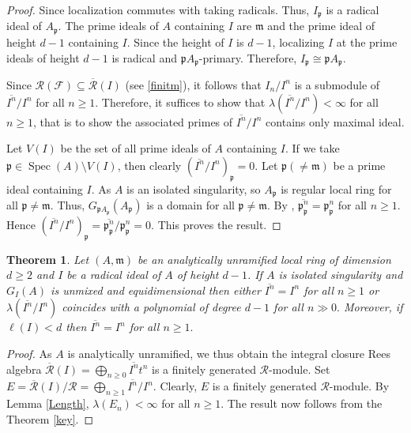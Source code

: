 \documentclass[11pt]{amsart}
\theoremstyle{plain}
\newtheorem{theorem}{Theorem}[section]
\newcommand{\p}{\mathfrak{p}}
\newcommand{\m}{\mathfrak{m}}
\newcommand{\R}{\mathcal{R}}
\newcommand{\F}{\mathcal{F}}
\newcommand{\Spec}{\operatorname{Spec}}
\theoremstyle{plain}
\begin{document}
\begin{proof}


Since localization commutes with taking radicals. Thus, $I_{\p}$ is a radical ideal of $A_{\p}$.  The prime ideals of $A$ containing $I$ are $\m$ and the prime ideal of height $d-1$ containing $I$. Since the height of $I$ is $d-1$, localizing $I$ at the prime ideals of height $d-1$ is radical and $\p A_\p$-primary. Therefore,
$I_{\p}\cong \p A_\p.$

Since $\R(\F)\subseteq \overline{\R}(I)$ (see \ref{finitm}), it follows that $I_n/I^n$ is a submodule of  $\overline{I^n}/I^n$ for all $n\geq 1$. Therefore, it suffices to show that $\lambda(\overline{I^n}/I^n)<\infty$ for all $n\geq 1$, that is to show the associated primes of $\overline{I^n}/{I^n}$ contains only maximal ideal.

Let $V(I)$ be the set of all prime ideals of $A$ containing $I$. If we take $\p\in {\Spec}(A)\setminus V(I)$, then clearly $(\overline{I^n}/{I^n})_{\p}=0.$ Let $\p(\neq \m)$ be a prime ideal containing $I.$ As $A$ is an isolated singularity, so $A_{\p}$ is regular local ring for all $\p\neq \m$. Thus, $G_{\p A_{\p}}(A_{\p})$ is a domain for all $\p\neq \m$. By \cite[Lemma 3.1]{JKV}, $\overline{\p_{\p}^n}=\p_{\p}^n$ for all $n\geq 1.$ Hence $(\overline{I^n}/{I^n})_{\p}=\overline{\p_{\p}^n}/\p_{\p}^n=0$. This proves the result.


\end{proof}


\begin{theorem}
\label{Thm:finitelength}
Let $(A,\m)$ be an analytically unramified local ring of dimension $d\geq 2$ and $I$ be a radical ideal of $A$ of height $d-1$. If $A$ is isolated singularity and ${G}_{I}(A)$ is unmixed and equidimensional then either $\overline{I^n}={I^n}$  for all $n\geq 1$ or $\lambda(\overline{I^n}/I^n)$ coincides with a polynomial of degree $d-1$ for all $n\gg0.$ Moreover, if  $\ell(I)<d$ then $\overline{I^n}={I^n}$ for all $n\geq 1.$
\end{theorem}
\begin{proof}


  As $A$ is analytically unramified, we thus obtain the integral closure Rees algebra $\overline{\R}(I)=\bigoplus_{n\geq 0}\overline{I^n}t^n$ is a finitely generated $\R$-module. Set $E=\overline{\R}(I)/\R=\bigoplus_{n\geq 1}\overline{I^n}/{I^n}$. Clearly, $E$ is a finitely generated $\R$-module. By Lemma \ref{Length}, $\lambda(E_n)<\infty$ for all $n\geq 1$. The result now follows from the Theorem \ref{key}.


\end{proof}
\end{document}

